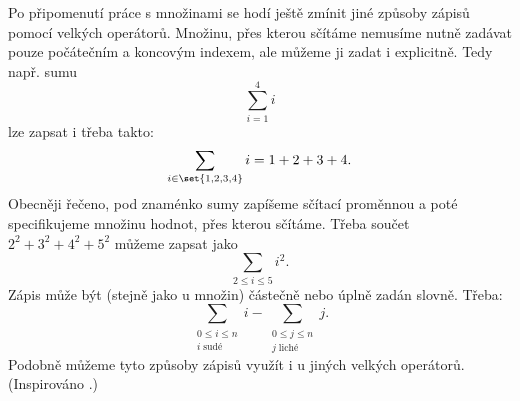 Po připomenutí práce s množinami se hodí ještě zmínit jiné způsoby zápisů pomocí velkých operátorů. Množinu, přes kterou sčítáme nemusíme nutně zadávat pouze počátečním a koncovým indexem, ale můžeme ji zadat i explicitně. Tedy např. sumu
\begin{equation*}
    \sum_{i=1}^{4}{i}
\end{equation*}
lze zapsat i třeba takto:
\begin{equation*}
    \sum_{i \in \set{1,2,3,4}}{i}=1+2+3+4.
\end{equation*}
Obecněji řečeno, pod znaménko sumy zapíšeme sčítací proměnnou a poté specifikujeme množinu hodnot, přes kterou sčítáme. Třeba součet $2^2+3^2+4^2+5^2$ můžeme zapsat jako
\begin{equation*}
    \sum_{2 \leq i \leq 5}{i^2}.
\end{equation*}
Zápis může být (stejně jako u množin) částečně nebo úplně zadán slovně. Třeba:
\begin{equation*}
    \sum_{\substack{0 \leq i \leq n\\ i\;\text{sudé}}}{i}-\sum_{\substack{0 \leq j \leq n\\ j\;\text{liché}}}{j}.
\end{equation*}
Podobně můžeme tyto způsoby zápisů využít i u jiných velkých operátorů. (Inspirováno \cite{MatousekNesetril2009}.)
